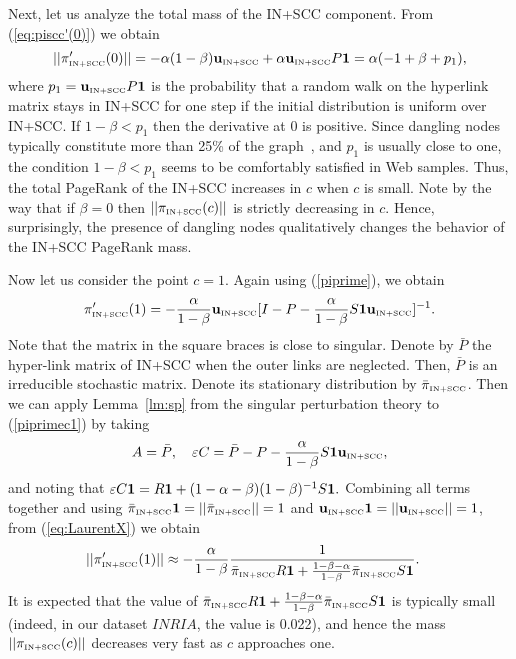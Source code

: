 \documentclass{article}
\newcommand{\eps}{\varepsilon}
\newcommand{\onedn}{{\bf 1}}
\newcommand{\piscc}{\pi_{\mbox{\tiny IN+SCC}}}
\newcommand{\scc}{{\mbox{\tiny IN+SCC}}}
\newcommand{\onescc}{{\bf 1}}
\newcommand{\oneout}{{\bf 1}}
\def\u{{{\bf u}_{\mbox{\tiny IN+SCC}}}}
\begin{document}
Next, let us analyze the total mass of the IN+SCC component. From
(\ref{eq:piscc'(0)}) we obtain
$$
||\pi'_\scc(0)||=-\alpha(1-\beta)\u +\alpha\u
P\onescc=\alpha(-1+\beta+p_1),
$$
where $p_1=\u P \onescc$ is the probability that a random walk on
the hyperlink matrix stays in IN+SCC for one step if the initial
distribution is uniform over IN+SCC.  If $1-\beta<p_1$ then the
derivative at 0 is positive. Since dangling nodes typically
constitute more than 25\% of the graph~\cite{Eiron04}, and $p_1$
is usually close to one, the condition $1-\beta<p_1$ seems to be
comfortably satisfied in Web samples. Thus, the total PageRank
of the IN+SCC increases in $c$ when $c$ is small. Note by the way
that if $\beta=0$ then $||\piscc(c)||$ is strictly decreasing in $c$.
Hence, surprisingly, the presence of dangling
nodes qualitatively changes the behavior of the IN+SCC PageRank
mass.

Now let us consider the point $c=1$. Again using (\ref{piprime}),
we obtain
\begin{equation}
\label{piprimec1} \pi'_\scc(1) = -
\frac{\alpha}{1-\beta} \u
[I-P-\frac{\alpha}{1-\beta}S\onedn\u]^{-1}.
\end{equation}
Note that the matrix in the square braces is close to singular.
Denote by $\bar{P}$ the hyper-link matrix of IN+SCC when the outer
links are neglected. Then, $\bar{P}$ is an irreducible stochastic
matrix. Denote its stationary distribution by $\bar{\pi}_{\scc}$.
Then we can apply Lemma~\ref{lm:sp} from the singular perturbation
theory to (\ref{piprimec1}) by taking
\[
A = \bar{P},\quad
\eps C = \bar{P} - P - \frac{\alpha}{1-\beta}S\onedn\u,
\]
and noting that $ \eps C \onescc = R\oneout
+(1-\alpha-\beta)(1-\beta)^{-1}S\onedn. $ Combining all terms
together and using $\bar{\pi}_\scc \onescc = ||\bar{\pi}_\scc||=1$
and $\u \onescc = ||\u||=1$, from (\ref{eq:LaurentX}) we obtain
\begin{align*}
||\pi'_\scc(1)|| &\approx
- \frac{\alpha}{1-\beta} \frac{1}{\bar{\pi}_\scc R\oneout
+\frac{1-\beta-\alpha}{1-\beta}\bar{\pi}_\scc S\onedn}.
\end{align*}
It is expected that the value of $\bar{\pi}_\scc R\oneout
+\frac{1-\beta-\alpha}{1-\beta}\bar{\pi}_\scc S\onedn$ is typically
small (indeed, in our dataset $INRIA$, the value is 0.022), and
hence the mass\\  $||\piscc(c)||$ decreases very fast as $c$
approaches one.
\end{document}
